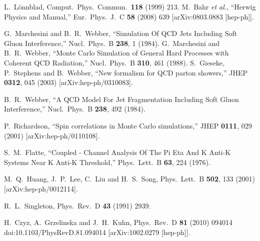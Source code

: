 \documentclass{article}
\begin{document}
\begin{thebibliography}{99}
 L.~L\"onnblad, Comput.~Phys.~Commun.\ {\bf 118} (1999) 213.
  M.~Bahr {\it et al.},
  ``Herwig Physics and Manual,''
  Eur.\ Phys.\ J.\  C {\bf 58} (2008) 639
  [arXiv:0803.0883 [hep-ph]].

  G.~Marchesini and B.~R.~Webber,
  ``Simulation Of QCD Jets Including Soft Gluon Interference,''
  Nucl.\ Phys.\  B {\bf 238}, 1 (1984).
  G.~Marchesini and B.~R.~Webber,
   ``Monte Carlo Simulation of General Hard Processes with Coherent QCD
  Radiation,''
  Nucl.\ Phys.\  B {\bf 310}, 461 (1988).
  S.~Gieseke, P.~Stephens and B.~Webber,
  ``New formalism for QCD parton showers,''
  JHEP {\bf 0312}, 045 (2003)
  [arXiv:hep-ph/0310083].

  B.~R.~Webber,
  ``A QCD Model For Jet Fragmentation Including Soft Gluon Interference,''
  Nucl.\ Phys.\  B {\bf 238}, 492 (1984).

  P.~Richardson,
  ``Spin correlations in Monte Carlo simulations,''
  JHEP {\bf 0111}, 029 (2001)
  [arXiv:hep-ph/0110108].

  S.~M.~Flatte,
   ``Coupled - Channel Analysis Of The Pi Eta And K Anti-K Systems Near K Anti-K
  Threshold,''
  Phys.\ Lett.\  B {\bf 63}, 224 (1976).

  M.~Q.~Huang, J.~P.~Lee, C.~Liu and H.~S.~Song,
  Phys.\ Lett.\  B {\bf 502}, 133 (2001)
  [arXiv:hep-ph/0012114].

  R.~L.~Singleton,
  Phys.\ Rev.\  D {\bf 43} (1991) 2939.

H.~Czyz, A.~Grzelinska and J.~H.~Kuhn,
Phys.\ Rev.\ D {\bf 81} (2010) 094014
doi:10.1103/PhysRevD.81.094014
[arXiv:1002.0279 [hep-ph]].


\end{thebibliography}
\end{document}
